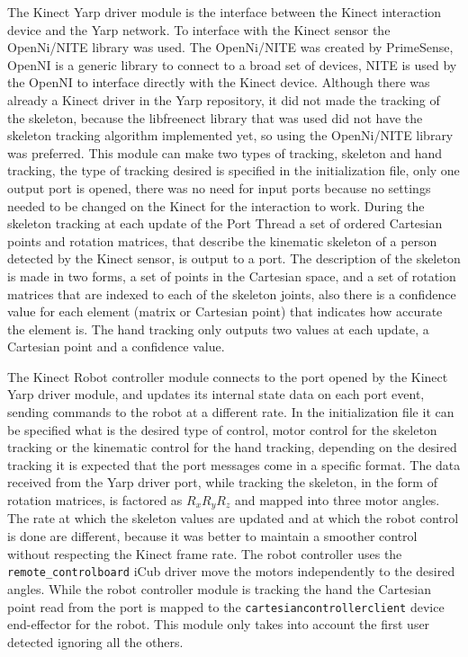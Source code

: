 	The Kinect Yarp driver module is the interface between the Kinect interaction device and the Yarp network. To interface with the Kinect sensor the OpenNi/NITE library was used. The OpenNi/NITE was created by PrimeSense, OpenNI is a generic library to connect to a broad set of devices, NITE is used by the OpenNI to interface directly with the Kinect device. Although there was already a Kinect driver in the Yarp repository, it did  not made the tracking of the skeleton, because the libfreenect library that was used did not have the skeleton tracking algorithm implemented yet, so using the OpenNi/NITE library was preferred. This module can make two types of tracking, skeleton and hand tracking, the type of tracking desired is specified in the initialization file, only one output port is opened, there was no need for input ports because no settings needed to be changed on the Kinect for the interaction to work. During the skeleton tracking at each update of the Port Thread a set of ordered Cartesian points and rotation matrices, that describe the kinematic skeleton of a person detected by the Kinect sensor, is output to a port. The description of the skeleton is made in two forms, a set of points in the Cartesian space, and a set of rotation matrices that are indexed to each of the skeleton joints, also there is a confidence value for each element (matrix or Cartesian point) that indicates how accurate the element is. The hand tracking only outputs two values at each update, a Cartesian point and a confidence value.
	
	The Kinect Robot controller module connects to the port opened by the Kinect Yarp driver module, and updates its internal state data on each port event, sending commands to the robot at a different rate. In the initialization file it can be specified what is the desired type of control, motor control for the skeleton tracking or the kinematic control for the hand tracking, depending on the desired tracking it is expected that the port messages come in a specific format. The data received from the Yarp driver port, while tracking the skeleton, in the form of rotation matrices, is factored as \begin{math}R_{x}R_{y}R_{z}\end{math} and mapped into three motor angles. The rate at which the skeleton values are updated and at which the robot control is done are different, because it was better to maintain a smoother control without respecting the Kinect frame rate. The robot controller uses the \verb|remote_controlboard| iCub driver move the motors independently to the desired angles. While the robot controller module is tracking the hand the Cartesian point read from the port is mapped to the \verb|cartesiancontrollerclient| device end-effector for the robot. This module only takes into account the first user detected ignoring all the others.
	
